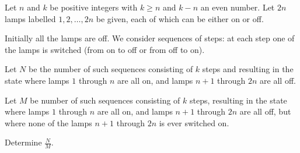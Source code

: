 Let $ n$ and $ k$ be positive integers with $ k \geq n$ and $ k - n$ an even number. Let $ 2n$ lamps labelled $1, 2, \dots, 2n$ be given, each of which can be either on or off.

 Initially all the lamps are off. We consider sequences of steps: at 
each step one of the lamps is switched (from on to off or from off to 
on).

Let $ N$ be the number of such sequences consisting of $ k$ steps and resulting in the state where lamps $ 1$ through $ n$ are all on, and lamps $ n + 1$ through $ 2n$ are all off.

Let $ M$ be number of such sequences consisting of $ k$ steps, resulting in the state where lamps $ 1$ through $ n$ are all on, and lamps $ n + 1$ through $ 2n$ are all off, but where none of the lamps $ n + 1$ through $ 2n$ is ever switched on.

Determine $ \frac {N}{M}$.

